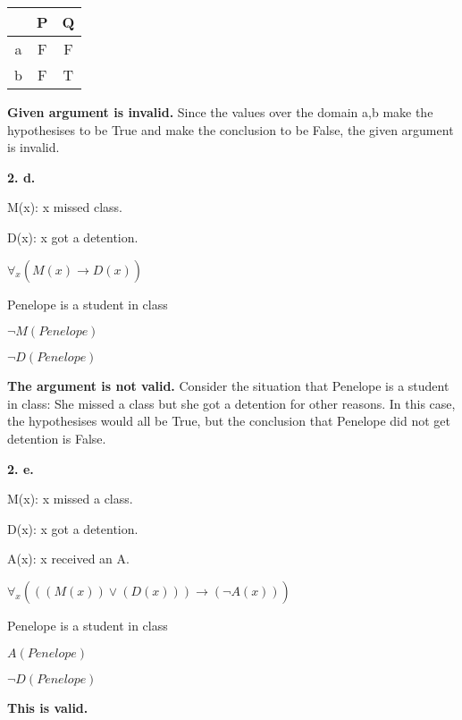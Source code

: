 \documentclass[11pt]{article}
\begin{document}
	\begin{center}
	\begin{tabular}{||c c c||} 
    \hline
     & P & Q \\ [0.5ex] 
    \hline\hline
    a & F & F \\ 
    \hline
    b & F & T \\
    \hline
    \end{tabular}
	\end{center}
	
	\textbf{Given argument is invalid.}
	Since the values over the domain {a,b} make the hypothesises to be True and make the conclusion to be False, the given argument is invalid. 
	
	\vspace{2mm}
	\textbf{2. d.}
	
	M(x): x missed class.
	
	D(x): x got a detention.
	
	\begin{center}
	$\forall_x (M(x)\xrightarrow[]{}D(x))$
	
	Penelope is a student in class
	
	$\neg M(Penelope)$
	
	$\neg D(Penelope)$
	\end{center}
	
	\textbf{The argument is not valid.}
	Consider the situation that Penelope is a student in class: She missed a class but she got a detention for other reasons. In this case, the hypothesises would all be True, but the conclusion that Penelope did not get detention is False.
	
	\vspace{2mm}
	\textbf{2. e.}
	
	M(x): x missed a class.
	
	D(x): x got a detention.
	
	A(x): x received an A.
	
	\begin{center}
	$\forall_x(((M(x))\vee (D(x)))\xrightarrow[]{}(\neg A(x)))$
	
	Penelope is a student in class
	
	$A(Penelope)$
	
	$\neg D(Penelope)$
	
	\end{center}
	\textbf{This is valid.}
	
\end{document}
